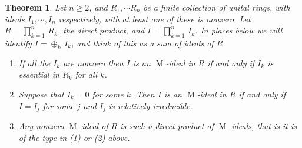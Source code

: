 \documentclass[10pt,a4paper]{amsart}
\newtheorem{theorem}{Theorem}
\DeclareMathOperator{\m}{M}
\begin{document}
\begin{theorem} \label{fix} Let $n \geq 2$, and $R_1,  \cdots R_n$ be a finite collection of unital rings, with ideals $I_1, \cdots , I_n$ respectively, with
at least one of these is nonzero.
Let  $R =  \prod_{k=1}^n \, R_k$, the direct product, and  $I = \prod_{k=1}^n \, I_k$.
In places below we will  identify $I = \oplus_k \, I_k$, and think of this as a sum of ideals of $R$. 
\begin{enumerate}
\item If all the $I_k$ are nonzero then $I$ is  an $\m$-ideal in $R$ if and only if $I_k$ is essential in $R_k$ for all $k$.
\item Suppose that  $I_k = 0$ for some $k$.  Then   $I$ is an $\m$-ideal in $R$ if and only if $I = I_j$ for some $j$
and  $I_j$ is relatively irreducible.

\item Any  nonzero
$\m$-ideal of $R$ is such a direct product of $\m$-ideals, that is it is of the type in {\rm (1)} or {\rm 
 (2)} above. 
\end{enumerate} \end{theorem}
\end{document}

